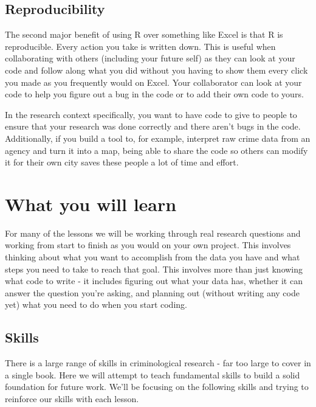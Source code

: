 \documentclass[
]{krantz}
\begin{document}
\hypertarget{reproducibility}{%
\subsection{Reproducibility}\label{reproducibility}}

The second major benefit of using R over something like Excel is that R is reproducible. Every action you take is written down. This is useful when collaborating with others (including your future self) as they can look at your code and follow along what you did without you having to show them every click you made as you frequently would on Excel. Your collaborator can look at your code to help you figure out a bug in the code or to add their own code to yours.

In the research context specifically, you want to have code to give to people to ensure that your research was done correctly and there aren't bugs in the code. Additionally, if you build a tool to, for example, interpret raw crime data from an agency and turn it into a map, being able to share the code so others can modify it for their own city saves these people a lot of time and effort.

\hypertarget{what-you-will-learn}{%
\section{What you will learn}\label{what-you-will-learn}}

For many of the lessons we will be working through real research questions and working from start to finish as you would on your own project. This involves thinking about what you want to accomplish from the data you have and what steps you need to take to reach that goal. This involves more than just knowing what code to write - it includes figuring out what your data has, whether it can answer the question you're asking, and planning out (without writing any code yet) what you need to do when you start coding.

\hypertarget{skills}{%
\subsection{Skills}\label{skills}}

There is a large range of skills in criminological research - far too large to cover in a single book. Here we will attempt to teach fundamental skills to build a solid foundation for future work. We'll be focusing on the following skills and trying to reinforce our skills with each lesson.
\end{document}
